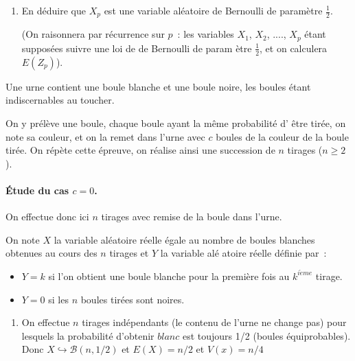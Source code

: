 \begin{exercice}
\begin{enumerate}
\begin{enumerate}
\item En d\'{e}duire que $X_{p}$ est une variable al\'{e}atoire de Bernoulli
de param\`{e}tre $\displaystyle\frac{1}{2}$.

(On raisonnera par r\'{e}currence sur $p$~: les variables $X_{1}$, $X_{2}$,
...., $X_{p}$ \'{e}tant suppos\'{e}es suivre une loi de de Bernoulli de param%
\`{e}tre $\displaystyle\frac{1}{2}$, et on calculera $E(Z_{p})$).
\end{enumerate}
\end{enumerate}

\end{exercice}


\begin{correction}


Une urne contient une boule blanche et une boule noire, les boules \'etant
indiscernables au toucher.

On y pr\'el\`eve une boule, chaque boule ayant la m\^{e}me probabilit\'e d'%
\^{e}tre tir\'ee, on note sa couleur, et on la remet dans l'urne avec $c$
boules de la couleur de la boule tir\'ee. On r\'ep\`ete cette \'epreuve, on
r\'ealise ainsi une succession de $n$ tirages ($n\geqslant 2$).

\paragraph{\'Etude du cas $c=0$.}

On effectue donc ici $n$ tirages avec remise de la boule dans l'urne.

On note $X$ la variable al\'{e}atoire r\'{e}elle \'{e}gale au nombre de
boules blanches obtenues au cours des $n$ tirages et $Y$ la variable al\'{e}%
atoire r\'{e}elle d\'{e}finie par~:

\begin{itemize}
\item $Y=k$ si l'on obtient une boule blanche pour la premi\`{e}re fois au $%
k^{i\grave{e}me}$ tirage.

\item $Y=0$ si les $n$ boules tir\'{e}es sont noires.
\end{itemize}

\begin{enumerate}
\item On effectue $n$ tirages ind\'{e}pendants (le contenu de l'urne ne
change pas) pour lesquels la probabilit\'{e} d'obtenir $blanc$ est toujours
1/2 (boules \'{e}quiprobables). Donc $X\hookrightarrow \mathcal{B}\left(
n,1/2\right) $ et $E\left( X\right) =n/2$ et $V\left( x\right) =n/4$


\end{enumerate}
\end{correction}
